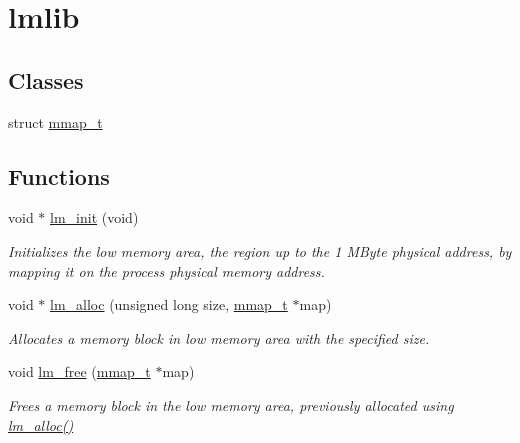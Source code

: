 \hypertarget{group__lmlib}{}\section{lmlib}
\label{group__lmlib}
\subsection*{Classes}
\begin{DoxyCompactItemize}
\item 
struct \hyperlink{structmmap__t}{mmap\+\_\+t}
\end{DoxyCompactItemize}
\subsection*{Functions}
\begin{DoxyCompactItemize}
\item 
void $\ast$ \hyperlink{group__lmlib_ga00a9c17c01e794a6bfc80fc5c6ab1ed1}{lm\+\_\+init} (void)
\begin{DoxyCompactList}\small\item\em Initializes the low memory area, the region up to the 1 M\+Byte physical address, by mapping it on the process\textquotesingle{} physical memory address. \end{DoxyCompactList}\item 
void $\ast$ \hyperlink{group__lmlib_gae45d971ce2ffcf4dc2677eba033a92cd}{lm\+\_\+alloc} (unsigned long size, \hyperlink{structmmap__t}{mmap\+\_\+t} $\ast$map)
\begin{DoxyCompactList}\small\item\em Allocates a memory block in low memory area with the specified size. \end{DoxyCompactList}\item 
void \hyperlink{group__lmlib_ga73e89d9c297b7390021fb545513579c6}{lm\+\_\+free} (\hyperlink{structmmap__t}{mmap\+\_\+t} $\ast$map)
\begin{DoxyCompactList}\small\item\em Frees a memory block in the low memory area, previously allocated using \hyperlink{group__lmlib_gae45d971ce2ffcf4dc2677eba033a92cd}{lm\+\_\+alloc()} \end{DoxyCompactList}\end{DoxyCompactItemize}
